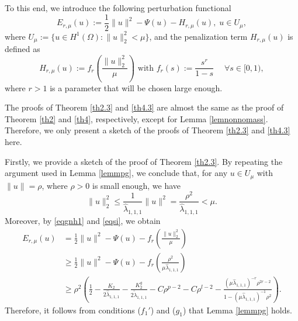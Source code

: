 \documentclass[11pt]{amsart}
\newcommand{\norm}[1]{\lVert#1\rVert}
\numberwithin{equation}{section}
\begin{document}
To this end, we introduce the following perturbation functional
$$
E_{r, \mu}(u) := \frac{1}{2}\norm{u}^{2}-\Psi(u)-H_{r,\mu}(u),\; u \in U_{\mu},
$$
where $U_{\mu} := \{u \in H^1(\Omega): \norm{u}_2^2<\mu\}$, and the penalization term $H_{r, \mu}(u)$ is defined as
$$
H_{r, \mu}(u) := f_{r}\left(\frac{\norm{u}_2^2}{\mu}\right) \text { with } f_{r}(s) := \frac{s^{r}}{1-s} \; \quad \forall s \in [0,1),
$$
where $r>1$ is a parameter that will be chosen large enough.

The proofs of Theorem \ref{th2.3} and \ref{th4.3} are almost the same as the proof of Theorem \ref{th2} and \ref{th4}, respectively, except for Lemma \ref{lemnonnomass}. Therefore, we only present a sketch of the proofs of Theorem \ref{th2.3} and \ref{th4.3} here.

Firstly, we provide a sketch of the proof of Theorem \ref{th2.3}. By repeating the argument used in Lemma \ref{lemmpg}, we conclude that, for any $u \in U_{\mu}$ with $\|u\|=\rho$, where $\rho>0$ is small enough, we have
$$
\norm{u}_{2}^2 \leq \frac{1}{\hat{\lambda}_{1,1,1}}\|u\|^{2}=\frac{\rho^{2}}{\hat{\lambda}_{1,1,1}} <\mu.
$$
Moreover, by \eqref{eqgnh1} and \eqref{eqsi}, we obtain
$$
\begin{aligned}
E_{r, \mu}(u) & =\frac{1}{2}\|u\|^{2}-\Psi(u)-f_{r}\left(\frac{\norm{u}^2_2}{\mu}\right) \\
& \geq \frac{1}{2}\|u\|^{2}-\Psi(u)-f_{r}\left(\frac{\rho^{2}}{\mu{\hat{\lambda}_{1,1,1}}}\right) \\
& \geq \rho^{2}\left(\frac{1}{2}-\frac{K_2}{2{\hat{\lambda}_{1,1,1}}}-\frac{K_2^g}{2{\tilde{\lambda}_{1,1,1}}}-C \rho^{p-2}-C\rho^{l-2}-\frac{(\mu{\hat{\lambda}_{1,1,1}})^{-r} \rho^{2 r-2}}{1-(\mu{\hat{\lambda}_{1,1,1}})^{-1}\rho^{2}}\right).
\end{aligned}
$$
Therefore, it follows from conditions ($f_1'$) and ($g_1$) that Lemma \ref{lemmpg} holds.
\end{document}
